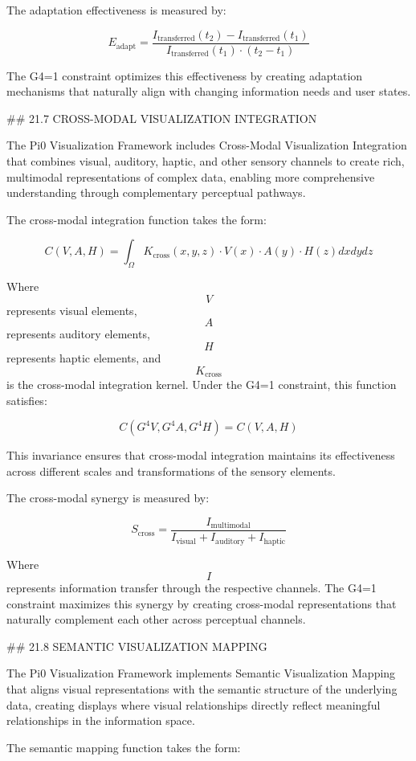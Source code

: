 The adaptation effectiveness is measured by:

$$ E_{\text{adapt}} = \frac{I_{\text{transferred}}(t_2) - I_{\text{transferred}}(t_1)}{I_{\text{transferred}}(t_1) \cdot (t_2 - t_1)} $$

The G4=1 constraint optimizes this effectiveness by creating adaptation mechanisms that naturally align with changing information needs and user states.

## 21.7 CROSS-MODAL VISUALIZATION INTEGRATION

The Pi0 Visualization Framework includes Cross-Modal Visualization Integration that combines visual, auditory, haptic, and other sensory channels to create rich, multimodal representations of complex data, enabling more comprehensive understanding through complementary perceptual pathways.

The cross-modal integration function takes the form:

$$ C(V, A, H) = \int_{\Omega} K_{\text{cross}}(x, y, z) \cdot V(x) \cdot A(y) \cdot H(z) dx dy dz $$

Where $$ V $$ represents visual elements, $$ A $$ represents auditory elements, $$ H $$ represents haptic elements, and $$ K_{\text{cross}} $$ is the cross-modal integration kernel. Under the G4=1 constraint, this function satisfies:

$$ C(G^4 V, G^4 A, G^4 H) = C(V, A, H) $$

This invariance ensures that cross-modal integration maintains its effectiveness across different scales and transformations of the sensory elements.

The cross-modal synergy is measured by:

$$ S_{\text{cross}} = \frac{I_{\text{multimodal}}}{I_{\text{visual}} + I_{\text{auditory}} + I_{\text{haptic}}} $$

Where $$ I $$ represents information transfer through the respective channels. The G4=1 constraint maximizes this synergy by creating cross-modal representations that naturally complement each other across perceptual channels.

## 21.8 SEMANTIC VISUALIZATION MAPPING

The Pi0 Visualization Framework implements Semantic Visualization Mapping that aligns visual representations with the semantic structure of the underlying data, creating displays where visual relationships directly reflect meaningful relationships in the information space.

The semantic mapping function takes the form:

